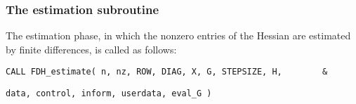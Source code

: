 \documentclass{galahad}
\newcommand{\packagename}{FDH}
\begin{document}

\subsubsection{The estimation subroutine}
The estimation phase, in which the nonzero entries of the Hessian
are estimated by finite differences, is called as follows:
\vspace*{1mm}

\hspace{8mm}
{\tt CALL \packagename\_estimate( n, nz, ROW, DIAG, X, G, STEPSIZE, H, \,\,\,\,\,\,   \& }
\vspace*{-1mm}

\hspace{41mm}
{\tt data, control, inform, userdata, eval\_G )}
\end{document}
